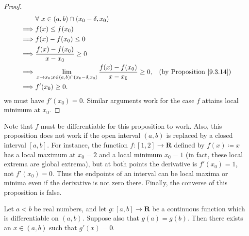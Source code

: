 \begin{proof}
\begin{align*}
                 & \forall\ x \in (a, b) \cap (x_0 - \delta, x_0)                                                                                        \\
        \implies & f(x) \leq f(x_0)                                                                                                                      \\
        \implies & f(x) - f(x_0) \leq 0                                                                                                                  \\
        \implies & \frac{f(x) - f(x_0)}{x - x_0} \geq 0                                                                                                  \\
        \implies & \lim_{x \to x_0 ; x \in (a, b) \cap (x_0 - \delta, x_0)} \frac{f(x) - f(x_0)}{x - x_0} \geq 0, & \text{(by Proposition \ref{9.3.14})} \\
        \implies & f'(x_0) \geq 0.
    \end{align*}
    we must have \(f'(x_0) = 0\).
    Similar arguments work for the case \(f\) attains local minimum at \(x_0\).
\end{proof}

\begin{note}
    Note that \(f\) must be differentiable for this proposition to work.
    Also, this proposition does not work if the open interval \((a, b)\) is replaced by a closed interval \([a, b]\).
    For instance, the function \(f : [1, 2] \to \mathbf{R}\) defined by \(f(x) \coloneqq x\) has a local maximum at \(x_0 = 2\) and a local minimum \(x_0 = 1\) (in fact, these local extrema are global extrema), but at both points the derivative is \(f'(x_0) = 1\), not \(f'(x_0) = 0\).
    Thus the endpoints of an interval can be local maxima or minima even if the derivative is not zero there.
    Finally, the converse of this proposition is false.
\end{note}

\begin{theorem}\label{10.2.7}
    Let \(a < b\) be real numbers, and let \(g : [a, b] \to \mathbf{R}\) be a continuous function which is differentiable on \((a, b)\).
    Suppose also that \(g(a) = g(b)\).
    Then there exists an \(x \in (a, b)\) such that \(g'(x) = 0\).
\end{theorem}

